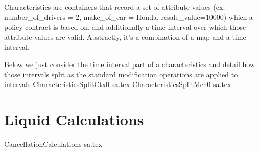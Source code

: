 Characteristics are containers that record a set of attribute values
(ex: number\_of\_drivers = 2, make\_of\_car = Honda, resale\_value=10000)
which a policy contract is based on, and additionally a time interval over which
those attribute values are valid. Abstractly, it's a combination of a map and a time
interval. 

Below we just consider the time interval part of a characteristics and detail
how those intervals split as the standard modification operations are applied
to intervals
{CharacteristicsSplitCtx0-sa.tex}
{CharacteristicsSplitMch0-sa.tex}

\section{Liquid Calculations}
\label{sec:03:5}

{CancellationCalculations-sa.tex}


